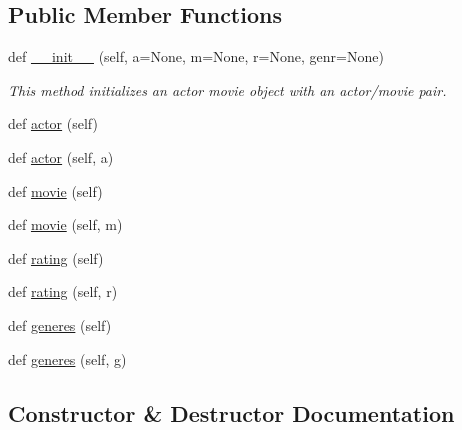 \subsection*{Public Member Functions}
\begin{DoxyCompactItemize}
\item 
def \mbox{\hyperlink{classbridges_1_1data__src__dependent_1_1actor__movie__imdb_1_1_actor_movie_i_m_d_b_add733f3ecfc9282d102cee6bf5e20674}{\+\_\+\+\_\+init\+\_\+\+\_\+}} (self, a=None, m=None, r=None, genr=None)
\begin{DoxyCompactList}\small\item\em This method initializes an actor movie object with an actor/movie pair. \end{DoxyCompactList}\item 
def \mbox{\hyperlink{classbridges_1_1data__src__dependent_1_1actor__movie__imdb_1_1_actor_movie_i_m_d_b_aff9f7941225e72653d26171a596c6ef7}{actor}} (self)
\item 
def \mbox{\hyperlink{classbridges_1_1data__src__dependent_1_1actor__movie__imdb_1_1_actor_movie_i_m_d_b_a030a7f94d4cfc3a105f4e0218a382276}{actor}} (self, a)
\item 
def \mbox{\hyperlink{classbridges_1_1data__src__dependent_1_1actor__movie__imdb_1_1_actor_movie_i_m_d_b_a05c035927b682e537b0931a1951ac579}{movie}} (self)
\item 
def \mbox{\hyperlink{classbridges_1_1data__src__dependent_1_1actor__movie__imdb_1_1_actor_movie_i_m_d_b_acf1fb5f37a8fa19ee503b031a20638d5}{movie}} (self, m)
\item 
def \mbox{\hyperlink{classbridges_1_1data__src__dependent_1_1actor__movie__imdb_1_1_actor_movie_i_m_d_b_a38ab0b7ab41a2c2c31111264de3952cb}{rating}} (self)
\item 
def \mbox{\hyperlink{classbridges_1_1data__src__dependent_1_1actor__movie__imdb_1_1_actor_movie_i_m_d_b_a72585e9e7ad9d2d2409cbd4f6fb92fcc}{rating}} (self, r)
\item 
def \mbox{\hyperlink{classbridges_1_1data__src__dependent_1_1actor__movie__imdb_1_1_actor_movie_i_m_d_b_a4fcdcdeb2812b905c1e4f260833ddbf0}{generes}} (self)
\item 
def \mbox{\hyperlink{classbridges_1_1data__src__dependent_1_1actor__movie__imdb_1_1_actor_movie_i_m_d_b_acd36a6c77775745c7a5b56f33fa3e6f4}{generes}} (self, g)
\end{DoxyCompactItemize}


\subsection{Constructor \& Destructor Documentation}
\mbox{\label{classbridges_1_1data__src__dependent_1_1actor__movie__imdb_1_1_actor_movie_i_m_d_b_add733f3ecfc9282d102cee6bf5e20674}} 
